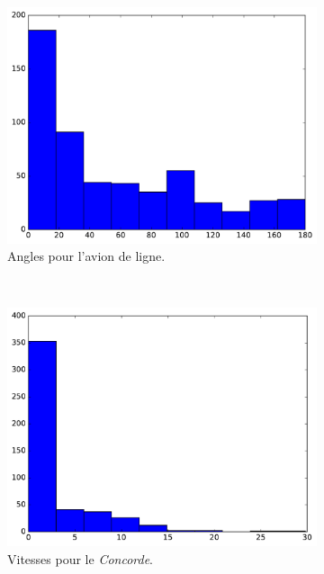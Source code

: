\begin{figure}[htb]
\begin{subfigure}[t]{\subImgWaStats}
			\centering
			\includegraphics[width=\textwidth]{figures/ch3/chinaA_angle}
			\caption{Angles pour l'avion de ligne.}
			\label{fig:chinaA_angle}
		\end{subfigure}
		~
		\begin{subfigure}[t]{\subImgWaStats}
			\centering
			\includegraphics[width=\textwidth]{figures/ch3/concordeA_speed}
			\caption{Vitesses pour le \emph{Concorde}.}
			\label{fig:concordeA_speed}
		\end{subfigure}
		~
		\begin{subfigure}[t]{\subImgWaStats}
			\centering

\end{subfigure}
\end{figure}

